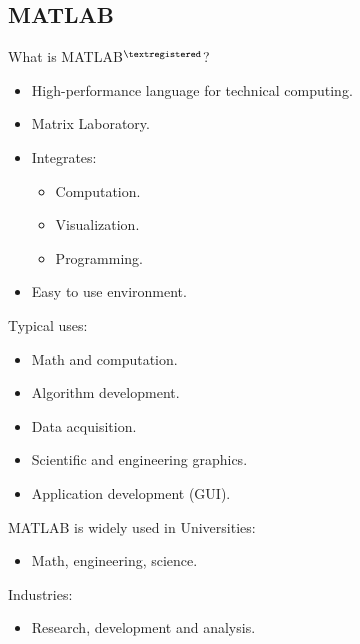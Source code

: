 
\subsection{MATLAB}


\begin{frame}
What is MATLAB$^{\textregistered}$?
\begin{itemize}
\item High-performance language for technical computing.
\item Matrix Laboratory.
\item Integrates:
\begin{itemize}
\item Computation.
\item Visualization.
\item Programming.
\end{itemize}
\item Easy to use environment.
\end{itemize}
\end{frame}


\begin{frame}
Typical uses:
\begin{itemize}
\item Math and computation.
\item Algorithm development.
\item Data acquisition.
\item Scientific and engineering graphics.
\item Application development (GUI).
\end{itemize}
\end{frame}


\begin{frame}
MATLAB is widely used in Universities:
\begin{itemize}
\item Math, engineering, science.
\end{itemize}
Industries:
\begin{itemize}
\item Research, development and analysis.
\end{itemize}
\end{frame}

